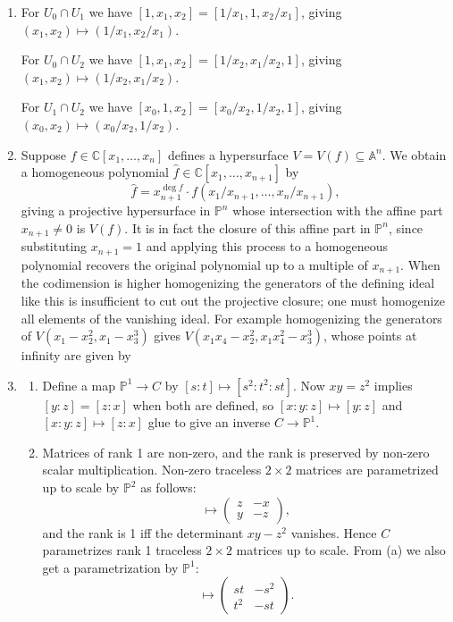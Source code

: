 \documentclass{article}
\theoremstyle{definition}
\renewcommand{\P}{\mathbb{P}}
\newcommand{\A}{\mathbb{A}}
\newcommand{\C}{\mathbb{C}}
\begin{document}
\begin{enumerate}
\item
For $U_0\cap U_1$ we have $[1,x_1,x_2]=[1/x_1,1,x_2/x_1]$, giving
$(x_1,x_2)\mapsto(1/x_1,x_2/x_1)$.

For $U_0\cap U_2$ we have $[1,x_1,x_2]=[1/x_2,x_1/x_2,1]$, giving
$(x_1,x_2)\mapsto(1/x_2,x_1/x_2)$.

For $U_1\cap U_2$ we have $[x_0,1,x_2]=[x_0/x_2,1/x_2,1]$, giving
$(x_0,x_2)\mapsto(x_0/x_2,1/x_2)$.

\item
Suppose $f\in\C[x_1,\ldots,x_n]$ defines a hypersurface $V=V(f)\subseteq\A^n$.
We obtain a homogeneous polynomial $\hat f\in\C[x_1,\ldots,x_{n+1}]$ by
\begin{equation*}
    \hat f = x_{n+1}^{\deg f}\cdot f(x_1/x_{n+1},\ldots,x_n/x_{n+1}),
\end{equation*}
giving a projective hypersurface in $\P^n$ whose intersection with the affine
part $x_{n+1}\ne0$ is $V(f)$. It is in fact the closure of this affine part in
$\P^n$, since substituting $x_{n+1}=1$ and applying this process to a
homogeneous polynomial recovers the original polynomial up to a multiple of
$x_{n+1}$. When the codimension is higher homogenizing the generators of the
defining ideal like this is insufficient to cut out the projective closure; one
must homogenize all elements of the vanishing ideal. For example homogenizing
the generators of $V(x_1-x_2^2,x_1-x_3^3)$ gives
$V(x_1x_4-x_2^2,x_1x_4^2-x_3^3)$, whose points at infinity are given by

\item
\begin{enumerate}[label=(\alph*)]

\item 
Define a map $\P^1\to C$ by $[s:t]\mapsto[s^2:t^2:st]$. Now $xy=z^2$ implies
$[y:z]=[z:x]$ when both are defined, so $[x:y:z]\mapsto[y:z]$ and
$[x:y:z]\mapsto[z:x]$ glue to give an inverse $C\to\P^1$.

\item
Matrices of rank 1 are non-zero, and the rank is preserved by non-zero scalar
multiplication. Non-zero traceless $2\times2$ matrices are parametrized up to
scale by $\P^2$ as follows:
\begin{equation*}
    [x:y:z] \mapsto \begin{pmatrix}
        z & -x \\ y & -z
    \end{pmatrix},
\end{equation*}
and the rank is 1 iff the determinant $xy-z^2$ vanishes. Hence $C$ parametrizes
rank 1 traceless $2\times2$ matrices up to scale. From (a) we also get a
parametrization by $\P^1$:
\begin{equation*}
    [s:t] \mapsto \begin{pmatrix}
        st & -s^2 \\ t^2 & -st
    \end{pmatrix}.
\end{equation*}


\end{enumerate}
\end{enumerate}
\end{document}
